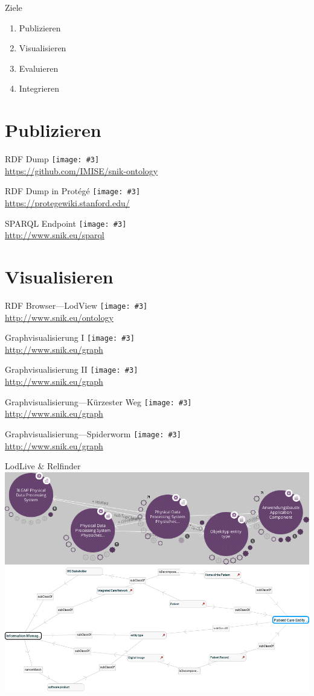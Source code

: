 \documentclass{beamer}
\newcommand{\imageslide}[3][]
{
\begin{frame}{#2}
\centering\texttt{[image: \#3]}
\\#1
\end{frame}
}
\begin{document}
\begin{frame}{Ziele}
\begin{enumerate}
\item Publizieren 
\item Visualisieren 
\item Evaluieren
\item Integrieren 
\end{enumerate}
\end{frame}

\section{Publizieren}

\imageslide[\url{https://github.com/IMISE/snik-ontology}]{RDF Dump}{../sniktec/img/rdfdump.png}
\imageslide[\url{https://protegewiki.stanford.edu/}]{RDF Dump in Protégé}{../sniktec/img/protege.png}
\imageslide[\url{http://www.snik.eu/sparql}]{SPARQL Endpoint}{../sniktec/img/sparqlresult.png}

\section{Visualisieren}

\imageslide[\url{http://www.snik.eu/ontology}]{RDF Browser---LodView}{../sniktec/img/browse-cio.png}

\imageslide[\url{http://www.snik.eu/graph}]{Graphvisualisierung I}{../sniktec/img/graph-entitytype.png}
\imageslide[\url{http://www.snik.eu/graph}]{Graphvisualisierung II}{../sniktec/img/graph-erf.png}
\imageslide[\url{http://www.snik.eu/graph}]{Graphvisualisierung---Kürzester Weg}{../sniktec/img/shortestpath.png}
\imageslide[\url{http://www.snik.eu/graph}]{Graphvisualisierung---Spiderworm}{../sniktec/img/spiderworm.png}


\begin{frame}{LodLive \& Relfinder}
\centering
\includegraphics[width=\textwidth]{../sniktec/img/lodlive.png}\\
\includegraphics[width=\textwidth]{../sniktec/img/relfinder.png}
\end{frame}
\end{document}

